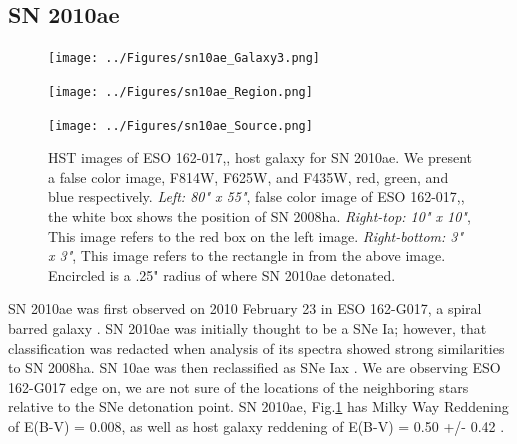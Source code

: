 \documentclass[preprint]{aastex}
\begin{document}
\subsection{SN 2010ae}
\begin{centering}
	\begin{figure}
	\begin{minipage}[c][7cm]{.6\textwidth}
		\vspace*{\fill}
		\centering
		\texttt{[image: ../Figures/sn10ae\_Galaxy3.png]}
			\label{fig:10aegal}
	\end{minipage}
	\begin{minipage}[c][7cm]{.5\textwidth}
		\vspace*{-.5cm}
		\centering
		\hspace*{-1.9cm}\texttt{[image: ../Figures/sn10ae\_Region.png]}
			\label{fig:r10ae}\par
		\hspace*{-1.9cm}\texttt{[image: ../Figures/sn10ae\_Source.png]}
			\label{fig:s10ae}
	\end{minipage}
	\caption{HST images of ESO 162-017,, host galaxy for SN 2010ae. We present a false color image,
	 F814W, F625W, and F435W, red, green, and blue respectively. \textit{Left: 80" x 55"}, false color image of 
	ESO 162-017,, the white box shows the position of SN 2008ha. \textit{Right-top: 10" x 10"},
	This image refers to the red box on the left image. 
	\textit{Right-bottom: 3" x 3"}, This image refers to the rectangle in from the above image. 
	Encircled is a .25" radius of where SN 2010ae detonated.}
	\label{fig:10ae_whole}
\end{figure}
\end{centering}

SN 2010ae was first observed on 2010 February 23 in ESO 162-G017, a spiral barred galaxy \citep{pig10}.
SN 2010ae was initially thought to be a SNe Ia; however, that classification
was redacted when analysis of its spectra showed strong similarities to
SN 2008ha. SN 10ae was then reclassified as SNe Iax \citep{str1003}.
We are observing ESO 162-G017 edge on, we are not sure of the locations of the neighboring stars
relative to the SNe detonation point. 
SN 2010ae, Fig.\ref{fig:10ae_whole} has Milky Way Reddening of E(B-V) = 0.008, as well as
host galaxy reddening of E(B-V) = 0.50 +/- 0.42 \citep{str1401}. 

\end{document}
